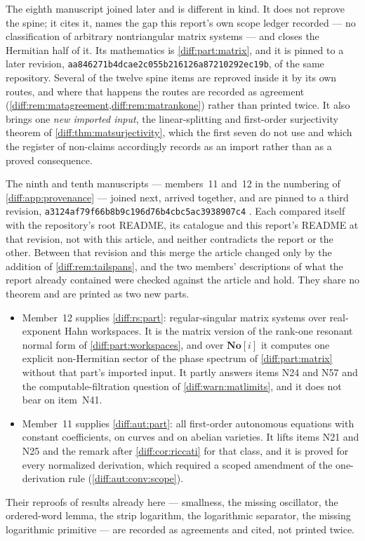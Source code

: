 \documentclass[11pt,letterpaper]{article}
\numberwithin{equation}{section}
\theoremstyle{definition}
\theoremstyle{remark}
\newcommand{\SC}{\mathbf{No}[i]}
\newcommand{\CommitB}{\nolinkurl{aa846271b4dcae2c055b216126a87210292ec19b}}
\newcommand{\CommitC}{\nolinkurl{a3124af79f66b8b9c196d76b4cbc5ac3938907c4}}
\begin{document}
The eighth manuscript joined later and is different in kind. It does not
reprove the spine; it cites it, names the gap this report's own scope ledger
recorded --- no classification of arbitrary nontriangular matrix systems ---
and closes the Hermitian half of it. Its mathematics is
\cref{diff:part:matrix}, and it is pinned to a later revision, \CommitB, of
the same repository. Several of the twelve spine items are reproved inside it by
its own routes, and where that happens the routes are recorded as agreement
(\cref{diff:rem:matagreement,diff:rem:matrankone}) rather than printed twice.
It also brings one \emph{new imported input}, the linear-splitting and
first-order surjectivity theorem of \cref{diff:thm:matsurjectivity}, which the
first seven do not use and which the register of non-claims accordingly
records as an import rather than as a proved consequence.

The ninth and tenth manuscripts --- members~11 and~12 in the numbering of
\cref{diff:app:provenance} --- joined next, arrived together, and are pinned to
a third revision, \CommitC{} \cite{RepoSnapshotC}. Each compared itself with the repository's root
README, its catalogue and this report's README at that revision, not with this
article, and neither contradicts the report or the other. Between that revision
and this merge the article changed only by the addition of
\cref{diff:rem:tailspans}, and the two members' descriptions of what the report
already contained were checked against the article and hold. They share no
theorem and are printed as two new parts.
\begin{itemize}[leftmargin=1.6em]
\item Member~12 supplies \cref{diff:rs:part}: regular-singular matrix systems
over real-exponent Hahn workspaces. It is the matrix version of the rank-one
resonant normal form of \cref{diff:part:workspaces}, and over $\SC$ it computes
one explicit non-Hermitian sector of the phase spectrum of
\cref{diff:part:matrix} without that part's imported input. It partly answers
items N24 and N57 and the computable-filtration question of
\cref{diff:warn:matlimits}, and it does not bear on item~N41.
\item Member~11 supplies \cref{diff:aut:part}: all first-order autonomous
equations with constant coefficients, on curves and on abelian varieties. It
lifts items N21 and N25 and the remark after \cref{diff:cor:riccati} for that
class, and it is proved for every normalized derivation, which required a
scoped amendment of the one-derivation rule (\cref{diff:aut:conv:scope}).
\end{itemize}
Their reproofs of results already here --- smallness, the missing oscillator,
the ordered-word lemma, the strip logarithm, the logarithmic separator, the
missing logarithmic primitive --- are recorded as agreements and cited, not
printed twice.
\end{document}
